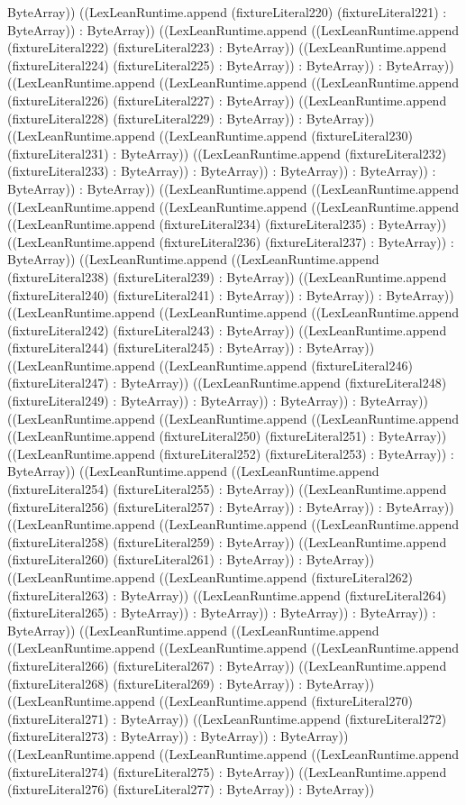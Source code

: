 \documentclass[11pt]{article}
\begin{document}
ByteArray)) ((LexLeanRuntime.append (fixtureLiteral220) (fixtureLiteral221) : ByteArray)) : ByteArray)) ((LexLeanRuntime.append ((LexLeanRuntime.append (fixtureLiteral222) (fixtureLiteral223) : ByteArray)) ((LexLeanRuntime.append (fixtureLiteral224) (fixtureLiteral225) : ByteArray)) : ByteArray)) : ByteArray)) ((LexLeanRuntime.append ((LexLeanRuntime.append ((LexLeanRuntime.append (fixtureLiteral226) (fixtureLiteral227) : ByteArray)) ((LexLeanRuntime.append (fixtureLiteral228) (fixtureLiteral229) : ByteArray)) : ByteArray)) ((LexLeanRuntime.append ((LexLeanRuntime.append (fixtureLiteral230) (fixtureLiteral231) : ByteArray)) ((LexLeanRuntime.append (fixtureLiteral232) (fixtureLiteral233) : ByteArray)) : ByteArray)) : ByteArray)) : ByteArray)) : ByteArray)) : ByteArray)) ((LexLeanRuntime.append ((LexLeanRuntime.append ((LexLeanRuntime.append ((LexLeanRuntime.append ((LexLeanRuntime.append ((LexLeanRuntime.append (fixtureLiteral234) (fixtureLiteral235) : ByteArray)) ((LexLeanRuntime.append (fixtureLiteral236) (fixtureLiteral237) : ByteArray)) : ByteArray)) ((LexLeanRuntime.append ((LexLeanRuntime.append (fixtureLiteral238) (fixtureLiteral239) : ByteArray)) ((LexLeanRuntime.append (fixtureLiteral240) (fixtureLiteral241) : ByteArray)) : ByteArray)) : ByteArray)) ((LexLeanRuntime.append ((LexLeanRuntime.append ((LexLeanRuntime.append (fixtureLiteral242) (fixtureLiteral243) : ByteArray)) ((LexLeanRuntime.append (fixtureLiteral244) (fixtureLiteral245) : ByteArray)) : ByteArray)) ((LexLeanRuntime.append ((LexLeanRuntime.append (fixtureLiteral246) (fixtureLiteral247) : ByteArray)) ((LexLeanRuntime.append (fixtureLiteral248) (fixtureLiteral249) : ByteArray)) : ByteArray)) : ByteArray)) : ByteArray)) ((LexLeanRuntime.append ((LexLeanRuntime.append ((LexLeanRuntime.append ((LexLeanRuntime.append (fixtureLiteral250) (fixtureLiteral251) : ByteArray)) ((LexLeanRuntime.append (fixtureLiteral252) (fixtureLiteral253) : ByteArray)) : ByteArray)) ((LexLeanRuntime.append ((LexLeanRuntime.append (fixtureLiteral254) (fixtureLiteral255) : ByteArray)) ((LexLeanRuntime.append (fixtureLiteral256) (fixtureLiteral257) : ByteArray)) : ByteArray)) : ByteArray)) ((LexLeanRuntime.append ((LexLeanRuntime.append ((LexLeanRuntime.append (fixtureLiteral258) (fixtureLiteral259) : ByteArray)) ((LexLeanRuntime.append (fixtureLiteral260) (fixtureLiteral261) : ByteArray)) : ByteArray)) ((LexLeanRuntime.append ((LexLeanRuntime.append (fixtureLiteral262) (fixtureLiteral263) : ByteArray)) ((LexLeanRuntime.append (fixtureLiteral264) (fixtureLiteral265) : ByteArray)) : ByteArray)) : ByteArray)) : ByteArray)) : ByteArray)) ((LexLeanRuntime.append ((LexLeanRuntime.append ((LexLeanRuntime.append ((LexLeanRuntime.append ((LexLeanRuntime.append (fixtureLiteral266) (fixtureLiteral267) : ByteArray)) ((LexLeanRuntime.append (fixtureLiteral268) (fixtureLiteral269) : ByteArray)) : ByteArray)) ((LexLeanRuntime.append ((LexLeanRuntime.append (fixtureLiteral270) (fixtureLiteral271) : ByteArray)) ((LexLeanRuntime.append (fixtureLiteral272) (fixtureLiteral273) : ByteArray)) : ByteArray)) : ByteArray)) ((LexLeanRuntime.append ((LexLeanRuntime.append ((LexLeanRuntime.append (fixtureLiteral274) (fixtureLiteral275) : ByteArray)) ((LexLeanRuntime.append (fixtureLiteral276) (fixtureLiteral277) : ByteArray)) : ByteArray)) 
\end{document}
